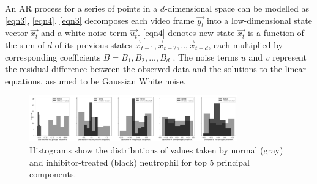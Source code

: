 \documentclass{article}
\newcommand{\squeezeup}{\vspace{-2.5mm}}
\begin{document}
An AR process for a series of points in a $d$-dimensional space can be modelled as \ref{eqn3}, \ref{eqn4}. \ref{eqn3} decomposes each video frame \(\overrightarrow{y_{t}}\) into a low-dimensional state vector \(\overrightarrow{x_{t}}\) and a white noise term \(\overrightarrow{u_{t}}\). \ref{eqn4} denotes new state \(\overrightarrow{x_{t}}\) is a function of the sum of $d$ of its previous states \(\overrightarrow{x}_{t-1},\overrightarrow{x}_{t-2},..,\overrightarrow{x}_{t-d}\), each multiplied by corresponding coefficients \( B = {B_{1} ,B_{2} ,...,B_{d}}\) \cite{spquinn}. The noise terms $u$ and $v$ represent the residual difference between the observed data and the solutions to the linear equations, assumed to be Gaussian White noise.
\squeezeup
\begin{figure}[htb]
\begin{minipage}[b]{1.0\linewidth}
  \centering
  \centerline{\includegraphics[width=9cm]{superimposedpca}}
  \vspace{-0.3cm}
\end{minipage}
\caption{Histograms show the distributions of values taken by normal (gray) and inhibitor-treated (black) neutrophil for top 5 principal components.}
\vspace{-0.5cm}
\end{figure}
\squeezeup
\vspace{-0.25cm}
\end{document}

